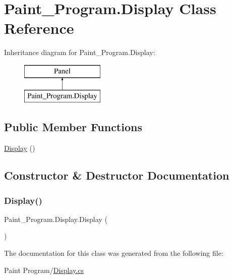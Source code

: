 \hypertarget{class_paint___program_1_1_display}{}\section{Paint\+\_\+\+Program.\+Display Class Reference}
\label{class_paint___program_1_1_display}
Inheritance diagram for Paint\+\_\+\+Program.\+Display\+:\begin{figure}[H]
\begin{center}
\leavevmode
\includegraphics[height=2.000000cm]{class_paint___program_1_1_display}
\end{center}
\end{figure}
\subsection*{Public Member Functions}
\begin{DoxyCompactItemize}
\item 
\mbox{\hyperlink{class_paint___program_1_1_display_ad3ceea08b77033c2ce4ecef813145133}{Display}} ()
\end{DoxyCompactItemize}


\subsection{Constructor \& Destructor Documentation}
\mbox{\label{class_paint___program_1_1_display_ad3ceea08b77033c2ce4ecef813145133}} 
\subsubsection{\texorpdfstring{Display()}{Display()}}
{\footnotesize\ttfamily Paint\+\_\+\+Program.\+Display.\+Display (\begin{DoxyParamCaption}{ }\end{DoxyParamCaption})\hspace{0.3cm}{\ttfamily [inline]}}



The documentation for this class was generated from the following file\+:\begin{DoxyCompactItemize}
\item 
Paint Program/\mbox{\hyperlink{_display_8cs}{Display.\+cs}}\end{DoxyCompactItemize}
